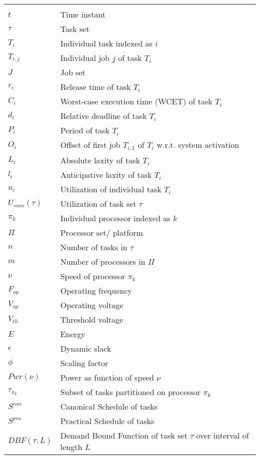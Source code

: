 \begin{center}
\begin{longtable}{l p{3.3in}}
\multicolumn{2}{c}{ }\\  [0.8ex]
$t$ &							Time instant	\\ 
$\tau$ &					Task set	\\
$T_{i}$ &					Individual task indexed as $i$	\\
$T_{i,j}$ &				Individual job $j$ of task $T_{i}$	\\
$J$ &							Job set	\\
$r_{i}$ &					Release time of task $T_{i}$	\\
$C_{i}$ &					Worst-case execution time (WCET) of task $T_{i}$	\\
$d_{i}$ &					Relative deadline of task $T_{i}$	\\
$P_{i}$ &					Period of task $T_{i}$	\\
$O_{i}$ &					Offset of first job $T_{i,1}$ of $T_{i}$ w.r.t. system activation	\\
$L_{i}$ &					Absolute laxity of task $T_{i}$	\\
$l_{i}$ &					Anticipative laxity of task $T_{i}$	\\
$u_{i}$ &					Utilization of individual task $T_{i}$\\
$U_{sum} (\tau)$ &					Utilization of task set $\tau$\\
$\pi_{k}$ &				Individual processor indexed as $k$\\
$\Pi$ &						Processor set/ platform\\
$n$ &							Number of tasks in $\tau$\\
$m$ &							Number of processors in $\Pi$\\
$\nu$ &						Speed of processor $\pi_{k}$\\
$F_{op}$	&				Operating frequency\\
$V_{op}$	&				Operating voltage\\
$V_{th}$	&				Threshold voltage\\
$E$	&							Energy\\
$\epsilon$	&			Dynamic slack\\
$\phi$	&					Scaling factor\\
$Pwr(\nu)$	&				Power as function of speed $\nu$\\
$\tau_{\pi_{k}}$ &	Subset of tasks partitioned on processor $\pi_{k}$\\
$S^{can}$ &				Canonical Schedule of tasks\\
$S^{pra}$ &				Practical Schedule of tasks\\
$DBF(\tau,L)$	&		Demand Bound Function of task set $\tau$ over interval of length $L$\\

\end{longtable}
\end{center}
